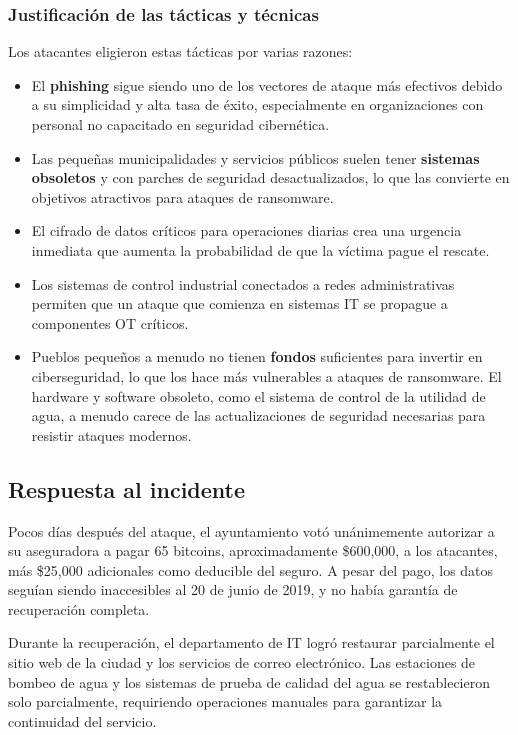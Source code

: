 \subsubsection{Justificación de las tácticas y técnicas}
Los atacantes eligieron estas tácticas por varias razones:

\begin{itemize}
    \item El \textbf{phishing} sigue siendo uno de los vectores de ataque más efectivos debido a su simplicidad y alta tasa de éxito, especialmente en organizaciones con personal no capacitado en seguridad cibernética.
    
    \item Las pequeñas municipalidades y servicios públicos suelen tener \textbf{sistemas obsoletos} y con parches de seguridad desactualizados, lo que las convierte en objetivos atractivos para ataques de ransomware.
    
    \item El cifrado de datos críticos para operaciones diarias crea una urgencia inmediata que aumenta la probabilidad de que la víctima pague el rescate.
    
    \item Los sistemas de control industrial conectados a redes administrativas permiten que un ataque que comienza en sistemas \textsc{IT} se propague a componentes \textsc{OT} críticos.
    
    \item Pueblos pequeños a menudo no tienen \textbf{fondos} suficientes para invertir en ciberseguridad, lo que los hace más vulnerables a ataques de ransomware.
    El hardware y software obsoleto, como el sistema de control de la utilidad de agua, a menudo carece de las actualizaciones de seguridad necesarias para resistir ataques modernos.
\end{itemize}



\subsection{Respuesta al incidente}
Pocos días después del ataque, el ayuntamiento votó unánimemente autorizar a su aseguradora a pagar 65 bitcoins, aproximadamente \$600,000, a los atacantes, más \$25,000 adicionales como deducible del seguro. A pesar del pago, los datos seguían siendo inaccesibles al 20 de junio de 2019, y no había garantía de recuperación completa.

Durante la recuperación, el departamento de \textsc{IT} logró restaurar parcialmente el sitio web de la ciudad y los servicios de correo electrónico. Las estaciones de bombeo de agua y los sistemas de prueba de calidad del agua se restablecieron solo parcialmente, requiriendo operaciones manuales para garantizar la continuidad del servicio.

